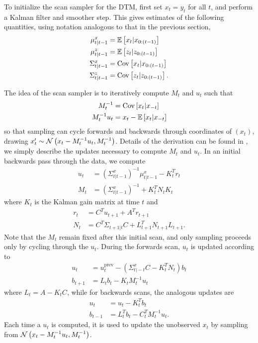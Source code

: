 \documentclass[14pt]{extreport}
\begin{document}
To initialize the scan sampler for the DTM, first set $x_t = y_t$ for all $t$,
and perform a Kalman filter and smoother step. This gives estimates of the
following quantities, using notation analogous to that in the previous section,
\begin{align*}
  \mu_{t \vert t - 1}^{x} &= \mathbb{E}\left[{x_t \vert x_{0:\left(t - 1\right)}}\right] \\
  \mu_{t \vert t - 1}^{z} &= \mathbb{E}\left[{z_t \vert z_{0:\left(t - 1\right)}}\right] \\
  \Sigma_{t \vert t - 1}^{x} &= \mathrm{Cov}\left[{x_t \vert x_{0:\left(t - 1\right)}}\right] \\
  \Sigma_{t \vert t - 1}^{z} &= \mathrm{Cov}\left[{z_t \vert z_{0 : \left(t - 1\right)}}\right].
\end{align*}

The idea of the scan sampler is to iteratively compute $M_t$ and $u_t$ such that
\begin{align*}
  M_t^{-1} &= \mathrm{Cov}\left[{x_t \vert x_{-t}}\right] \\
  M_t^{-1}u_t &= x_t - \mathbb{E}\left[{x_t \vert x_{-t}}\right]
\end{align*}
so that sampling can cycle forwards and backwards through coordinates of
$\left(x_t\right)$, drawing $x_t^{\prime} \sim \mathcal{N}\left(x_t - M_t^{-1}u_t,
M_t^{-1}\right)$. Details of the derivation can be found in \citep{de1997scan},
we simply describe the updates necessary to compute $M_t$ and $u_t$. In an
initial backwards pass through the data, we compute
\begin{align*}
  u_t &= \left(\Sigma_{t \vert t - 1}^{x}\right)^{-1}\mu_{t \vert t - 1}^{x} - K_t^{T}r_t \\
  M_t &= \left(\Sigma_{t \vert t - 1}^{x}\right)^{-1} + K_t^{T} N_t K_t
\end{align*}
where $K_t$ is the Kalman gain matrix at time $t$ and
\begin{align*}
  r_t &= C^T u_{t + 1} + A^{T}r_{t + 1} \\
  N_t &= C^{T} \Sigma_{t + 1 \vert t}C + L_{t + 1}^{T}N_{t + 1}L_{t + 1}.
\end{align*}
Note that the $M_t$ remain fixed after this initial scan, and only sampling
proceeds only by cycling through the $u_t$. During the forwards scan, $u_t$ is
updated according to
\begin{align*}
  u_t &= u_t^{\text{prev}} - \left(\Sigma_{t \vert -t}^{x} C - K_t^{T}N_t\right) b_t \\
  b_{t + 1} &= L_{t} b_t - K_t M_t^{-1}u_t
\end{align*}
where $L_t = A - K_t C$, while for backwards scans, the analogous updates are
\begin{align*}
  u_t &= u_t - K_t^{T} b_t \\
  b_{t - 1} &= L_t^T b_t - C_t^{T}M_t^{-1}u_t.
\end{align*}
Each time a $u_t$ is computed, it is used to update the unobserved $x_t$ by
sampling from $\mathcal{N}\left(x_t - M_t^{-1}u_t, M_t^{-1}\right)$.
\end{document}
